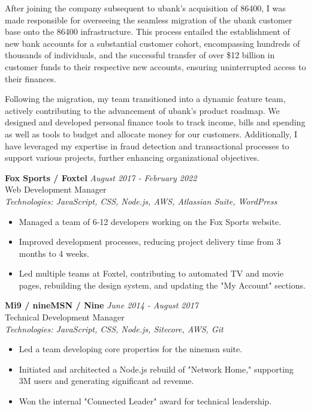 \documentclass[a4paper,10pt]{article}
\begin{document}
After joining the company subsequent to ubank's acquisition of 86400, I was made responsible for overseeing the 
seamless migration of the ubank customer base onto the 86400 infrastructure. This process entailed the establishment
of new bank accounts for a substantial customer cohort, encompassing hundreds of thousands of individuals, and the 
successful transfer of over \$12 billion in customer funds to their respective new accounts, ensuring uninterrupted 
access to their finances.

Following the migration, my team transitioned into a dynamic feature team, actively contributing to the advancement 
of ubank's product roadmap. We designed and developed personal finance tools to track income, bills and spending as 
well as tools to budget and allocate money for our customers. Additionally, I have leveraged my expertise in fraud 
detection and transactional processes to support various projects, further enhancing organizational objectives.

\textbf{Fox Sports / Foxtel} \hfill \textit{August 2017 - February 2022} \\
Web Development Manager \\
\textit{Technologies: JavaScript, CSS, Node.js, AWS, Atlassian Suite, WordPress}
\begin{itemize}
    \item Managed a team of 6-12 developers working on the Fox Sports website.
    \item Improved development processes, reducing project delivery time from 3 months to 4 weeks.
    \item Led multiple teams at Foxtel, contributing to automated TV and movie pages, rebuilding the design system, and updating the "My Account" sections.
\end{itemize}

\textbf{Mi9 / nineMSN / Nine} \hfill \textit{June 2014 - August 2017} \\
Technical Development Manager \\
\textit{Technologies: JavaScript, CSS, Node.js, Sitecore, AWS, Git}
\begin{itemize}
    \item Led a team developing core properties for the ninemsn suite.
    \item Initiated and architected a Node.js rebuild of "Network Home," supporting 3M users and generating significant ad revenue.
    \item Won the internal "Connected Leader" award for technical leadership.
\end{itemize}
\end{document}

